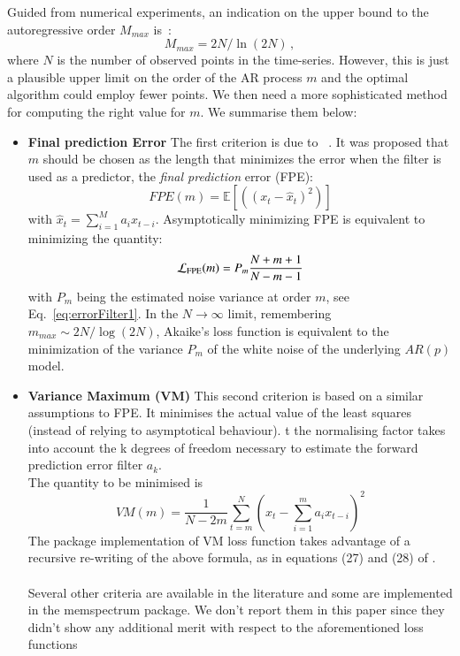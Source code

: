 \documentclass{aa}
\begin{document}
Guided from numerical experiments, an indication on the upper bound to the autoregressive order $M_{max}$ is~\citep{doi:10.1190/1.1440902}:
\begin{equation}\label{eq:MMAx}
M_{max} = 2N / \ln{(2N)}\,,
\end{equation}
where $N$ is the number of observed points in the time-series.
However, this is just a plausible upper limit on the order of the AR process $m$ and the optimal algorithm could employ fewer points.
We then need a more sophisticated method for computing the right value for $m$.
We summarise them below:

\begin{itemize}
\item \textbf{Final prediction Error} 
The first criterion is due to ~\citet{Akaike1970StatisticalPI}. It was proposed that $m$ should be chosen as the 
length that minimizes the error when the filter is used as a predictor, the \emph{final prediction} error (FPE): 
\begin{equation}
    FPE(m) = \mathbb{E}\left[ \left((x_t - \hat x_t) ^ 2\right) \right]
\end{equation}
with $\hat{x}_t = \sum_{i = 1}^M a_i x_{t - i}$.
Asymptotically minimizing FPE is equivalent to minimizing the quantity: 
\begin{equation}
    \mathcal{L}_{\rm FPE}(m) = P_{m} \frac{N + m + 1}{N - m - 1}
\end{equation}
with $P_m$ being the estimated noise variance at order $m$, see Eq.~\eqref{eq:errorFilter1}. In the $N \to \infty$ limit, 
remembering $m_{max} \sim 2N / \log(2N)$, Akaike's loss function is equivalent to the minimization of the variance $P_m$ of the white noise of the underlying $AR(p)$ model. 

\item \textbf{Variance Maximum (VM)}
This second criterion \cite{kay1988modern} is based on a similar assumptions to FPE. It minimises the actual value of the least squares (instead of relying to asymptotical behaviour). t the normalising factor takes into account the k degrees of freedom necessary to estimate the forward prediction error filter $a_k$.\\ The quantity to be minimised is
\begin{equation}
VM(m) = \frac{1}{N - 2m}\sum_{t=m}^N\left(x_t - \sum_{i=1}^m a_i x_{t-i} \right)^{2}
\end{equation}
The package implementation of VM loss function takes advantage of a recursive re-writing of the above formula, as in equations (27) and (28) of \citet{Cuoco_2001}.  \\ \\

Several other criteria are available in the literature \citet{doi:10.1029/WR018i004p01097} \citet{10.1214/aos/1176349858} and some are implemented in the memspectrum package. We don't report them in this paper since they didn't show any additional merit with respect to the aforementioned loss functions \\
\end{itemize}
\end{document}
